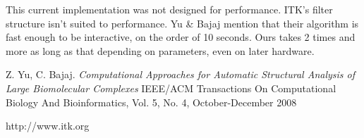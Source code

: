 \documentclass{article}
\begin{document}
This current implementation was not designed for performance. ITK's
filter structure isn't suited to performance. Yu \& Bajaj mention that
their algorithm is fast enough to be interactive, on the order of 10
seconds. Ours takes 2 times and more as long as that depending on parameters,
even on later hardware.

\begin{thebibliography}{9}
 Z. Yu, C. Bajaj. \textsl{Computational Approaches for Automatic Structural Analysis of Large Biomolecular Complexes}
IEEE/ACM Transactions On Computational Biology And Bioinformatics, Vol. 5, No. 4, October-December 2008

 http://www.itk.org

\end{thebibliography}
\end{document}

